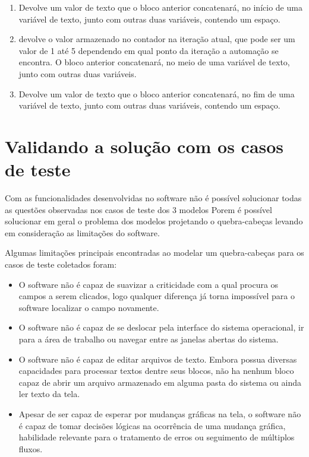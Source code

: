 \documentclass[tg]{mdtufsm}
\begin{document}
\begin{enumerate}[label*=\arabic*.]
\begin{enumerate}[label*=\arabic*.]
                    \end{enumerate}
                    \item Devolve um valor de texto que o bloco anterior concatenará, no início de uma variável de texto, junto com outras duas variáveis, contendo um espaço.
                    \item devolve o valor armazenado no contador na iteração atual, que pode ser um valor de 1 até 5 dependendo em qual ponto da iteração a automação se encontra. O bloco anterior concatenará, no meio de uma variável de texto, junto com outras duas variáveis.
                    \item Devolve um valor de texto que o bloco anterior concatenará, no fim de uma variável de texto, junto com outras duas variáveis, contendo um espaço.
                \end{enumerate}

            \section {Validando a solução com os casos de teste}

                Com as funcionalidades desenvolvidas no software não é possível solucionar todas as questões observadas nos casos de teste dos 3 modelos Porem é possível solucionar em geral o problema dos modelos projetando o quebra-cabeças levando em consideração as limitações do software.

                Algumas limitações principais encontradas ao modelar um quebra-cabeças para os casos de teste coletados foram:

                \begin{itemize}
                    \item O software não é capaz de suavizar a criticidade com a qual procura os campos a serem clicados, logo qualquer diferença já torna impossível para o software localizar o campo novamente.
                    \item O software não é capaz de se deslocar pela interface do sistema operacional, ir para a área de trabalho ou navegar entre as janelas abertas do sistema.
                    \item O software não é capaz de editar arquivos de texto. Embora possua diversas capacidades para processar textos dentre seus blocos, não ha nenhum bloco capaz de abrir um arquivo armazenado em alguma pasta do sistema ou ainda ler texto da tela.
                    \item Apesar de ser capaz de esperar por mudanças gráficas na tela, o software não é capaz de tomar decisões lógicas na ocorrência de uma mudança gráfica, habilidade relevante para o tratamento de erros ou seguimento de múltiplos fluxos.
                \end{itemize}
\end{document}
